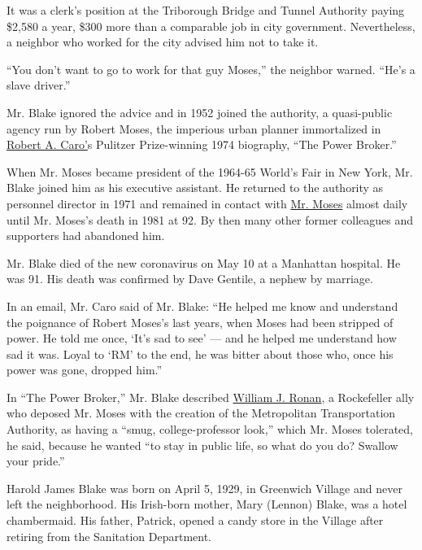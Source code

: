 It was a clerk's position at the Triborough Bridge and Tunnel Authority
paying \$2,580 a year, \$300 more than a comparable job in city
government. Nevertheless, a neighbor who worked for the city advised him
not to take it.

``You don't want to go to work for that guy Moses,'' the neighbor
warned. ``He's a slave driver.''

Mr. Blake ignored the advice and in 1952 joined the authority, a
quasi-public agency run by Robert Moses, the imperious urban planner
immortalized in
\href{https://www.nytimes.com/interactive/2019/04/01/magazine/robert-caro-working-memoir.html}{Robert
A. Caro'}s Pulitzer Prize-winning 1974 biography, ``The Power Broker.''

When Mr. Moses became president of the 1964-65 World's Fair in New York,
Mr. Blake joined him as his executive assistant. He returned to the
authority as personnel director in 1971 and remained in contact with
\href{https://www.nytimes.com/1981/07/30/obituaries/robert-moses-master-builder-is-dead-at-92.html}{Mr.
Moses} almost daily until Mr. Moses's death in 1981 at 92. By then many
other former colleagues and supporters had abandoned him.

Mr. Blake died of the new coronavirus on May 10 at a Manhattan hospital.
He was 91. His death was confirmed by Dave Gentile, a nephew by
marriage.

In an email, Mr. Caro said of Mr. Blake: ``He helped me know and
understand the poignance of Robert Moses's last years, when Moses had
been stripped of power. He told me once, `It's sad to see' --- and he
helped me understand how sad it was. Loyal to `RM' to the end, he was
bitter about those who, once his power was gone, dropped him.''

In ``The Power Broker,'' Mr. Blake described
\href{https://www.nytimes.com/2014/10/18/nyregion/william-j-ronan-architect-of-the-metropolitan-transportation-authority-dies-at-101.html}{William
J. Ronan}, a Rockefeller ally who deposed Mr. Moses with the creation of
the Metropolitan Transportation Authority, as having a ``smug,
college-professor look,'' which Mr. Moses tolerated, he said, because he
wanted ``to stay in public life, so what do you do? Swallow your
pride.''

Harold James Blake was born on April 5, 1929, in Greenwich Village and
never left the neighborhood. His Irish-born mother, Mary (Lennon) Blake,
was a hotel chambermaid. His father, Patrick, opened a candy store in
the Village after retiring from the Sanitation Department.

